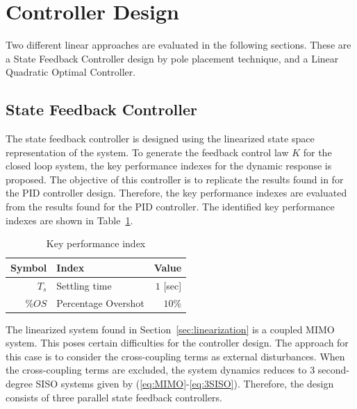 \documentclass[12pt]{article}
\begin{document}
\section{Controller Design}

Two different linear approaches are evaluated in the following sections. These are a State Feedback Controller design by pole placement technique, and a Linear Quadratic Optimal Controller.

\subsection{State Feedback Controller}
\label{sec:state-feedback}

The state feedback controller is designed using the linearized state space representation of the system. To generate the feedback control law $K$ for the closed loop system, the key performance indexes for the dynamic response is proposed. The objective of this controller is to replicate the results found in \cite{Boua04} for the PID controller design. Therefore, the key performance indexes are evaluated from the results found for the PID controller. The identified key performance indexes are shown in Table~\ref{tab:KPI}.

\begin{table} [t]
  \begin{center}
    \caption{Key performance index}
    \label{tab:KPI}
    \begin{tabular}{rlr}
      \hline
      Symbol & Index & Value \\
      \hline                  
      $T_s$ & Settling time & $1$ [sec]\\
      $\%OS$ & Percentage Overshot & $10\%$\\
      \hline
    \end{tabular}
  \end{center}
\end{table}

The linearized system found in Section~\ref{sec:linearization} is a coupled MIMO system. This poses certain difficulties for the controller design. The approach for this case is to consider the cross-coupling terms as external disturbances. When the cross-coupling terms are excluded, the system dynamics reduces to 3 second-degree SISO systems given by (\ref{eq:MIMO}-\ref{eq:3SISO}). Therefore, the design consists of three parallel state feedback controllers.
\end{document}
